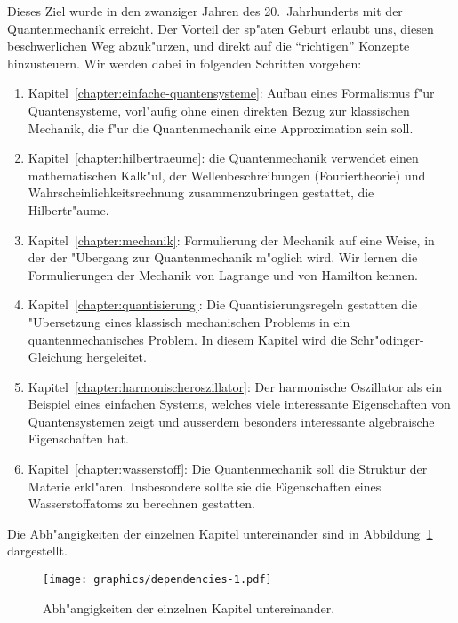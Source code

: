 Dieses Ziel wurde in den zwanziger Jahren des 20.~Jahrhunderts mit 
der Quantenmechanik erreicht.
Der Vorteil der sp"aten Geburt erlaubt uns, diesen beschwerlichen Weg
abzuk"urzen, und direkt auf die ``richtigen'' Konzepte hinzusteuern.
Wir werden dabei in folgenden Schritten vorgehen:
\begin{enumerate}
\item Kapitel~\ref{chapter:einfache-quantensysteme}:
Aufbau eines Formalismus f"ur Quantensysteme, vorl"aufig ohne einen
direkten Bezug zur klassischen Mechanik, die f"ur die Quantenmechanik
eine Approximation sein soll.
\item Kapitel~\ref{chapter:hilbertraeume}: die Quantenmechanik verwendet
einen mathematischen Kalk"ul, der Wellenbeschreibungen (Fouriertheorie)
und Wahrscheinlichkeitsrechnung zusammenzubringen gestattet, die Hilbertr"aume.
\item Kapitel~\ref{chapter:mechanik}: Formulierung der Mechanik auf 
eine Weise, in der der "Ubergang zur Quantenmechanik m"oglich wird.
Wir lernen die Formulierungen der Mechanik von Lagrange und von Hamilton
kennen.
\item Kapitel~\ref{chapter:quantisierung}: Die Quantisierungsregeln
gestatten die "Ubersetzung eines klassisch mechanischen Problems in 
ein quantenmechanisches Problem. In diesem Kapitel wird die
Schr"odinger-Gleichung hergeleitet.
\item Kapitel~\ref{chapter:harmonischeroszillator}: Der harmonische
Oszillator als ein Beispiel eines einfachen Systems, welches
viele interessante Eigenschaften von Quantensystemen zeigt und 
ausserdem besonders interessante algebraische Eigenschaften hat.
\item Kapitel~\ref{chapter:wasserstoff}: Die Quantenmechanik soll
die Struktur der Materie erkl"aren. Insbesondere sollte sie 
die Eigenschaften eines Wasserstoffatoms zu berechnen gestatten.
\end{enumerate}

Die Abh"angigkeiten der einzelnen Kapitel untereinander sind in
Abbildung~\ref{dependencies} dargestellt.
\begin{figure}
\centering
\texttt{[image: graphics/dependencies-1.pdf]}
\caption{Abh"angigkeiten der einzelnen Kapitel untereinander.
\label{dependencies}}
\end{figure}



